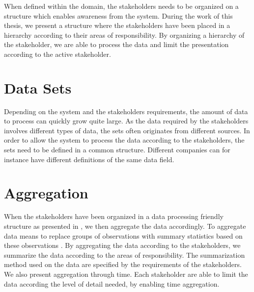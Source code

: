 When defined within the domain, the stakeholders needs to be organized on a 
structure which enables awareness from the system. During the work of this 
thesis, we present a structure where the stakeholders have been placed in a 
hierarchy according to their areas of responsibility. By organizing a 
hierarchy of the stakeholder, we are able to process the data and limit the 
presentation according to the active stakeholder. 

\section{Data Sets} %
\label{sec:intro_data_sets}
Depending on the system and the stakeholders requirements, the amount of data
to process can quickly grow quite large. As the data required by the
stakeholders involves different types of data, the sets often originates from
different sources. In order to allow the system to process the data according
to the stakeholders, the sets need to be defined in a common structure.
Different companies can for instance have different definitions of the same
data field.


\section{Aggregation} %
\label{sec:intro_aggregation}
When the stakeholders have been organized in a data processing friendly
structure as presented in , we then aggregate the 
data accordingly. To aggregate data means to replace groups of observations
with summary statistics based on these observations \cite{ wiki:Aggregation}.
By aggregating the data according to the stakeholders, we summarize the data
according to the areas of responsibility. The summarization method used on the 
data are specified by the requirements of the stakeholders. We also present
aggregation through time. Each stakeholder are able to limit the data 
according the level of detail needed, by enabling time aggregation.
\\



